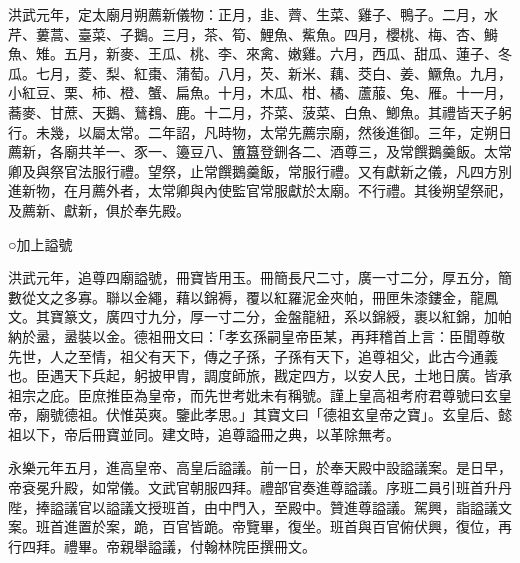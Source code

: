 洪武元年，定太廟月朔薦新儀物：正月，韭、薺、生菜、雞子、鴨子。二月，水芹、蔞蒿、臺菜、子鵝。三月，茶、筍、鯉魚、鮆魚。四月，櫻桃、梅、杏、鰣魚、雉。五月，新麥、王瓜、桃、李、來禽、嫩雞。六月，西瓜、甜瓜、蓮子、冬瓜。七月，菱、梨、紅棗、蒲萄。八月，芡、新米、藕、茭白、姜、鱖魚。九月，小紅豆、栗、柿、橙、蟹、扁魚。十月，木瓜、柑、橘、蘆菔、兔、雁。十一月，蕎麥、甘蔗、天鵝、鶿䳓、鹿。十二月，芥菜、菠菜、白魚、鯽魚。其禮皆天子躬行。未幾，以屬太常。二年詔，凡時物，太常先薦宗廟，然後進御。三年，定朔日薦新，各廟共羊一、豕一、籩豆八、簠簋登鉶各二、酒尊三，及常饌鵝羹飯。太常卿及與祭官法服行禮。望祭，止常饌鵝羹飯，常服行禮。又有獻新之儀，凡四方別進新物，在月薦外者，太常卿與內使監官常服獻於太廟。不行禮。其後朔望祭祀，及薦新、獻新，俱於奉先殿。

○加上謚號

洪武元年，追尊四廟謚號，冊寶皆用玉。冊簡長尺二寸，廣一寸二分，厚五分，簡數從文之多寡。聯以金繩，藉以錦褥，覆以紅羅泥金夾帕，冊匣朱漆鏤金，龍鳳文。其寶篆文，廣四寸九分，厚一寸二分，金盤龍紐，系以錦綬，裹以紅錦，加帕納於盝，盝裝以金。德祖冊文曰：「孝玄孫嗣皇帝臣某，再拜稽首上言：臣聞尊敬先世，人之至情，祖父有天下，傳之子孫，子孫有天下，追尊祖父，此古今通義也。臣遇天下兵起，躬披甲胄，調度師旅，戡定四方，以安人民，土地日廣。皆承祖宗之庇。臣庶推臣為皇帝，而先世考妣未有稱號。謹上皇高祖考府君尊號曰玄皇帝，廟號德祖。伏惟英爽。鑒此孝思。」其寶文曰「德祖玄皇帝之寶」。玄皇后、懿祖以下，帝后冊寶並同。建文時，追尊謚冊之典，以革除無考。

永樂元年五月，進高皇帝、高皇后謚議。前一日，於奉天殿中設謚議案。是日早，帝袞冕升殿，如常儀。文武官朝服四拜。禮部官奏進尊謚議。序班二員引班首升丹陛，捧謚議官以謚議文授班首，由中門入，至殿中。贊進尊謚議。駕興，詣謚議文案。班首進置於案，跪，百官皆跪。帝覽畢，復坐。班首與百官俯伏興，復位，再行四拜。禮畢。帝親舉謚議，付翰林院臣撰冊文。

